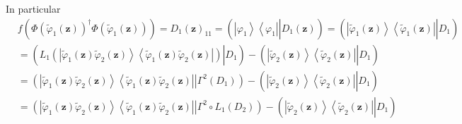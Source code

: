 \documentclass[aps,preprint]{revtex4}%
\begin{document}
In particular
\begin{align}
&  f\left(  \Phi\left(  \tilde{\varphi}_{1}\left(  \mathbf{z}\right)  \right)
^{\dagger}\Phi\left(  \tilde{\varphi}_{1}\left(  \mathbf{z}\right)  \right)
\right)  =D_{1}\left(  \mathbf{z}\right)  _{11}=\left(  \left.
\overset{}{\left\vert \varphi_{1}\right\rangle \left\langle \varphi
_{1}\right\vert }\right\vert D_{1}\left(  \mathbf{z}\right)  \right)  =\left(
\left.  \overset{}{\left\vert \tilde{\varphi}_{1}\left(  \mathbf{z}\right)
\right\rangle \left\langle \tilde{\varphi}_{1}\left(  \mathbf{z}\right)
\right\vert }\right\vert D_{1}\right)  \nonumber\\
&  =\left(  \left.  L_{1}\overset{}{\left(  \left\vert \tilde{\varphi}%
_{1}\left(  \mathbf{z}\right)  \tilde{\varphi}_{2}\left(  \mathbf{z}\right)
\right\rangle \left\langle \tilde{\varphi}_{1}\left(  \mathbf{z}\right)
\tilde{\varphi}_{2}\left(  \mathbf{z}\right)  \right\vert \right)
}\right\vert D_{1}\right)  -\left(  \left.  \overset{}{\left\vert
\tilde{\varphi}_{2}\left(  \mathbf{z}\right)  \right\rangle \left\langle
\tilde{\varphi}_{2}\left(  \mathbf{z}\right)  \right\vert }\right\vert
D_{1}\right)  \nonumber\\
&  =\left(  \left.  \left\vert \tilde{\varphi}_{1}\left(  \mathbf{z}\right)
\tilde{\varphi}_{2}\left(  \mathbf{z}\right)  \right\rangle \left\langle
\tilde{\varphi}_{1}\left(  \mathbf{z}\right)  \tilde{\varphi}_{2}\left(
\mathbf{z}\right)  \right\vert \right\vert \Gamma^{2}\left(  D_{1}\right)
\right)  -\left(  \left.  \overset{}{\left\vert \tilde{\varphi}_{2}\left(
\mathbf{z}\right)  \right\rangle \left\langle \tilde{\varphi}_{2}\left(
\mathbf{z}\right)  \right\vert }\right\vert D_{1}\right)  \nonumber\\
&  =\left(  \left.  \left\vert \tilde{\varphi}_{1}\left(  \mathbf{z}\right)
\tilde{\varphi}_{2}\left(  \mathbf{z}\right)  \right\rangle \left\langle
\tilde{\varphi}_{1}\left(  \mathbf{z}\right)  \tilde{\varphi}_{2}\left(
\mathbf{z}\right)  \right\vert \right\vert \Gamma^{2}\circ L_{1}\left(
D_{2}\right)  \right)  -\left(  \left.  \overset{}{\left\vert \tilde{\varphi
}_{2}\left(  \mathbf{z}\right)  \right\rangle \left\langle \tilde{\varphi}%
_{2}\left(  \mathbf{z}\right)  \right\vert }\right\vert D_{1}\right)
\end{align}%
\end{document}
